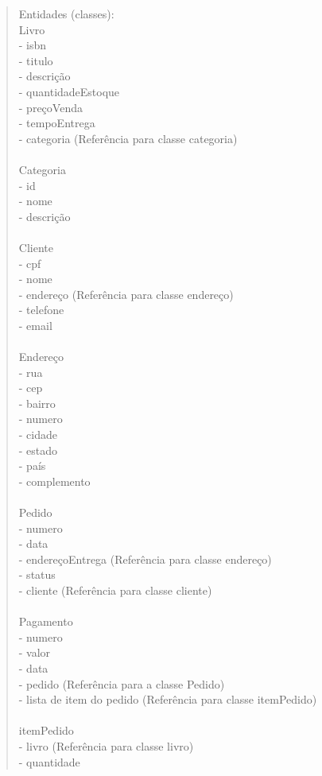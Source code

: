 \begin{quote}
Entidades (classes):\\
Livro {\\
   - isbn\\
   - titulo\\
   - descrição\\
   - quantidadeEstoque\\
   - preçoVenda\\
   - tempoEntrega\\
   - categoria (Referência para classe categoria)\\
}\\
Categoria {\\
   - id\\
   - nome\\
   - descrição\\
}\\
Cliente {\\
   - cpf\\
   - nome\\
   - endereço (Referência para classe endereço)\\
   - telefone\\
   - email\\
}\\
Endereço {\\
   - rua\\
   - cep\\
   - bairro\\
   - numero\\
   - cidade\\
   - estado\\
   - país\\
   - complemento\\
}\\
Pedido {\\
  - numero\\
  - data\\
  - endereçoEntrega (Referência para classe endereço)\\
  - status\\
  - cliente (Referência para classe cliente) \\
}\\
Pagamento {\\
  - numero\\
  - valor\\
  - data\\
  - pedido (Referência para a classe Pedido)\\
  - lista de item do pedido (Referência para classe itemPedido)\\
}\\
itemPedido {\\
   - livro (Referência para classe livro)\\
   - quantidade\\
}

\end{quote}

